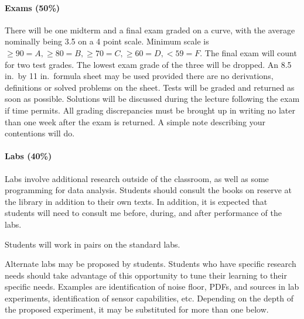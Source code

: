 \documentclass[letterpaper,10pt,english]{sphinxmanual}
\begin{document}
\paragraph{Exams (50\%)}
\label{\detokenize{classes/ME7690Syll:exams-50}}
There will be one midterm and a final exam graded on a curve, with the
average nominally being 3.5 on a 4 point scale. Minimum scale is
\(\geq 90 = A,\geq 80 = B, \geq 70 = C, \geq 60 = D, < 59 = F\). The
final exam will count for two test grades. The lowest exam grade of the
three will be dropped. An 8.5 in. by 11 in. formula sheet may be used
provided there are no derivations, definitions or solved problems on the
sheet. Tests will be graded and returned as soon as possible. Solutions
will be discussed during the lecture following the exam if time permits.
All grading discrepancies must be brought up in writing no later than
one week after the exam is returned. A simple note describing your
contentions will do.


\paragraph{Labs (40\%)}
\label{\detokenize{classes/ME7690Syll:labs-40}}
Labs involve additional research outside of the classroom, as well as
some programming for data analysis. Students should consult the books on
reserve at the library in addition to their own texts. In addition, it
is expected that students will need to consult me before, during, and
after performance of the labs.

Students will work in pairs on the standard labs.

Alternate labs may be proposed by students. Students who have specific
research needs should take advantage of this opportunity to tune their
learning to their specific needs. Examples are identification of noise
floor, PDFs, and sources in lab experiments, identification of sensor
capabilities, etc. Depending on the depth of the proposed experiment, it
may be substituted for more than one below.
\end{document}
